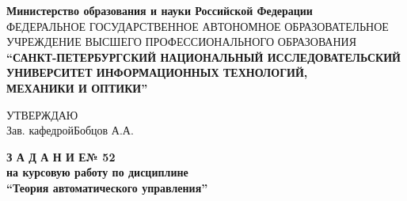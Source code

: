 \documentclass[fleqn, a4paper, 12pt, russian]{article}
\begin{document}
	\centering
	{\fontsize{14pt}{5cm}\selectfont \bfseries Министерство образования и науки Российской Федерации} \\ \vspace{0.5cm}
	{\fontsize{6.8pt}{5cm}\selectfont ФЕДЕРАЛЬНОЕ ГОСУДАРСТВЕННОЕ АВТОНОМНОЕ ОБРАЗОВАТЕЛЬНОЕ УЧРЕЖДЕНИЕ ВЫСШЕГО ПРОФЕССИОНАЛЬНОГО ОБРАЗОВАНИЯ} \\ 
	\vspace{0.5cm}
	{\fontsize{13pt}{5cm}\selectfont \bfseries “САНКТ-ПЕТЕРБУРГСКИЙ НАЦИОНАЛЬНЫЙ ИССЛЕДОВАТЕЛЬСКИЙ УНИВЕРСИТЕТ ИНФОРМАЦИОННЫХ ТЕХНОЛОГИЙ,} \\ \vspace{0.1cm}
	{\fontsize{13pt}{5cm}\selectfont \bfseries МЕХАНИКИ И ОПТИКИ”} \\ \vspace{1cm}
	
	\flushleft
	{\fontsize{12pt}{0cm} \hspace{2cm}УТВЕРЖДАЮ} \\ \vspace{0.1cm}
	{\fontsize{12pt}{0cm}\selectfont \hspace{10.5cm}Зав. кафедрой\hspace{1cm}Бобцов А.А.} \\ \vspace{1cm}
	
	\centering
	{\fontsize{18pt}{0cm}\selectfont \bfseries З А Д А Н И Е\hspace{0.2cm}№ 52}\\ \vspace{0.2cm}
	{\fontsize{16pt}{0cm}\selectfont \bfseries на курсовую работу по дисциплине}	\\ \vspace{0.2cm}
	{\fontsize{16pt}{0cm}\selectfont \bfseries \enquote{Теория автоматического управления}} \\ \vspace{1cm}
	
\end{document}
